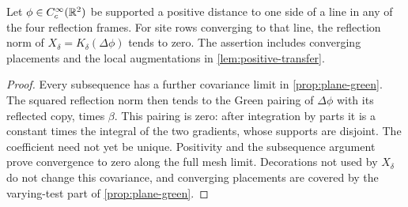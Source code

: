 \begin{corollary}
\label{cor:reflection-null}
Let $\phi\in C_c^\infty(\mathbb R^2)$ be supported a positive distance to one side
of a line in any of the four reflection frames. For site rows converging to
that line, the reflection norm of $X_\delta=K_\delta(\Delta\phi)$ tends to
zero. The assertion includes converging placements and the local
augmentations in \cref{lem:positive-transfer}.
\end{corollary}

\begin{proof}
Every subsequence has a further covariance limit in \cref{prop:plane-green}.
The squared reflection norm then tends to the Green pairing of
$\Delta\phi$ with its reflected copy, times $\beta$. This pairing is zero:
after integration by parts it is a constant times the integral of the two
gradients, whose supports are disjoint. The coefficient need not yet be
unique. Positivity and the subsequence argument prove convergence to zero
along the full mesh limit. Decorations not used by $X_\delta$ do not change
this covariance, and converging placements are covered by the varying-test
part of \cref{prop:plane-green}.
\end{proof}
